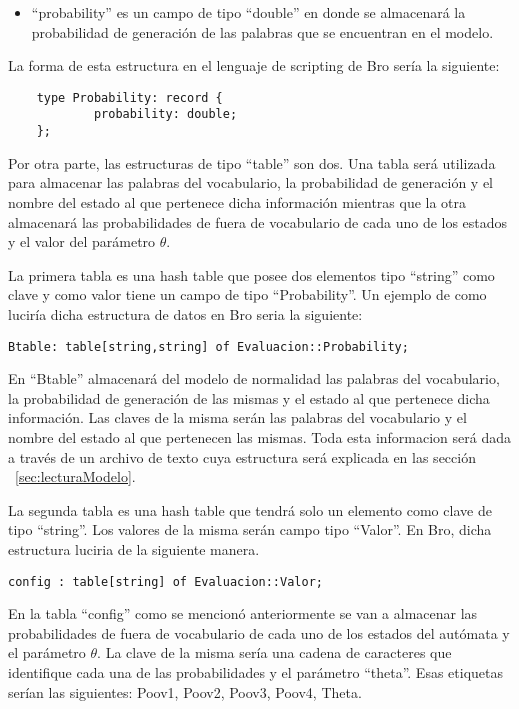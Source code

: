 \begin{itemize}
\item “probability” es un campo de tipo “double” en donde se almacenará la probabilidad de generación de las palabras que se encuentran en el modelo.
\end{itemize}

La forma de esta estructura en el lenguaje de scripting de Bro sería la siguiente:
\begin{verbatim}
    type Probability: record {
            probability: double;
    };
\end{verbatim}

Por otra parte, las estructuras de tipo “table” son dos. Una tabla será utilizada para almacenar las palabras del vocabulario, la probabilidad de generación y el nombre del estado al que pertenece dicha información mientras que la otra almacenará las probabilidades de fuera de vocabulario de cada uno de los estados y el valor del parámetro $\theta$.

La primera tabla es una hash table que posee dos elementos tipo “string” como clave y como valor tiene un campo de tipo “Probability”. Un ejemplo de como luciría dicha estructura de datos en Bro seria la siguiente:

\begin{verbatim}
Btable: table[string,string] of Evaluacion::Probability;
\end{verbatim}

En “Btable” almacenará del modelo de normalidad las palabras del vocabulario, la probabilidad de generación de las mismas y el estado al que pertenece dicha información. Las claves de la misma serán las palabras del vocabulario y el nombre del estado al que pertenecen las mismas. Toda esta informacion será dada a través de un archivo de texto cuya estructura será explicada en las sección ~\ref{sec:lecturaModelo}.

La segunda tabla es una hash table que tendrá solo un elemento como clave de tipo “string”. Los valores de la misma serán campo tipo “Valor”. En Bro, dicha estructura luciria de la siguiente manera.

\begin{verbatim}
config : table[string] of Evaluacion::Valor;
\end{verbatim}

En la tabla “config” como se mencionó anteriormente se van a almacenar las probabilidades de fuera de vocabulario de cada uno de los estados del autómata y el parámetro $\theta$. La clave de la misma sería una cadena de caracteres que identifique cada una de las probabilidades  y el parámetro “theta”. Esas etiquetas serían las siguientes: Poov1, Poov2, Poov3, Poov4, Theta.  

